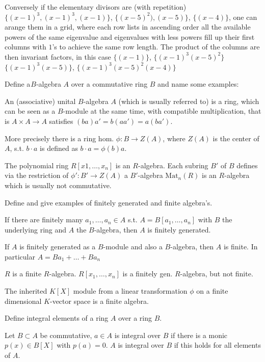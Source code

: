 Conversely if the elementary divisors are (with repetition) \(\{(x - 1)^3, (x - 1)^{3}, (x - 1)\}\), \(\{(x - 5)^2), (x - 5)\}\), \(\{(x - 4)\}\), one can arange them in a grid, where each row
lists in ascending order all the available powers of the same eigenvalue and eigenvalues with less powers fill up their first columns with \(1\)'s to achieve the same row length.
The product of the columns are then invariant factors, in this case \(\{(x - 1)\}\), \(\{(x - 1)^3(x - 5)^2\}\) \(\{(x - 1)^3(x - 5)\}\), \(\{(x - 1)^3(x - 5)^2(x - 4)\}\)


Define a \(B\)-algebra \(A\) over a commutative ring \(B\) and name some examples:

An (associative) unital \(B\)-algebra \(A\) (which is usually referred to) is a ring,
which can be seen as a \(B\)-module at the same time, with compatible multiplication, that is
\(A \times A \to A\) satisfies \((ba)a' = b(aa') = a(ba')\).

More precisely there is a ring hom. \(\phi : B \to Z(A)\), where \(Z(A)\) is the center of \(A\), s.t.
\(b \cdot a\) is defined as \(b \cdot a = \phi(b) a\).

The polynomial ring \(R[x1, \dots, x_n]\) is an \(R\)-algebra.
Each subring \(B'\) of \(B\) defines via the restriction of \(\phi' : B' \to Z(A)\) a \(B'\)-algebra
\(\text{Mat}_n(R)\) is an \(R\)-algebra which is usually not commutative.


Define and give examples of finitely generated and finite algebra's.

If there are finitely many \(a_1, \dots, a_n \in A\)  s.t. \(A = B[a_1, \dots, a_n]\) with \(B\) the
underlying ring and \(A\) the \(B\)-algebra, then \(A\) is finitely generated.

If \(A\) is finitely generated as a \(B\)-module and also a \(B\)-algebra, then \(A\) is finite.
In particular
\(A = Ba_1 + \dots + Ba_n\)

\(R\) is a finite \(R\)-algebra.
\(R[x_1, \dots, x_n]\) is a finitely gen. \(R\)-algebra, but not finite.

The inherited \(K[X]\) module from a linear transformation \(\phi\) on a finite dimensional \(K\)-vector space
is a finite algebra.


Define integral elements of a ring \(A\) over a ring \(B\).

Let \(B \subset A\) be commutative, \(a \in A\) is integral over \(B\) if there is a monic \(p(x) \in B[X]\) with 
\(p(a) = 0\). 
\(A\) is integral over \(B\) if this holds for all elements of \(A\).

